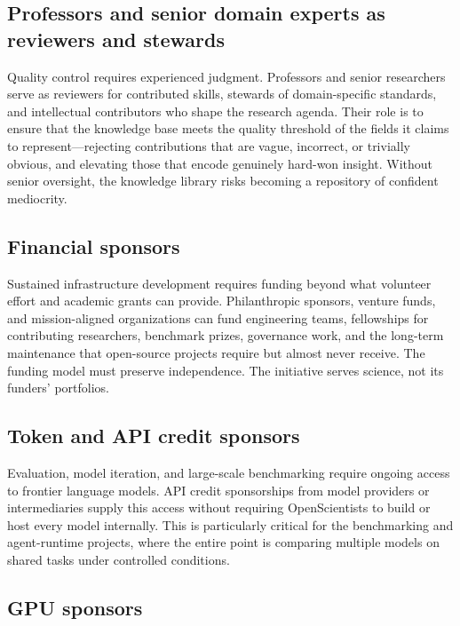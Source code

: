 \documentclass[11pt]{article}
\begin{document}
\subsection{Professors and senior domain experts as reviewers and stewards}

Quality control requires experienced judgment. Professors and senior researchers serve as reviewers for contributed skills, stewards of domain-specific standards, and intellectual contributors who shape the research agenda. Their role is to ensure that the knowledge base meets the quality threshold of the fields it claims to represent---rejecting contributions that are vague, incorrect, or trivially obvious, and elevating those that encode genuinely hard-won insight. Without senior oversight, the knowledge library risks becoming a repository of confident mediocrity.

\subsection{Financial sponsors}

Sustained infrastructure development requires funding beyond what volunteer effort and academic grants can provide. Philanthropic sponsors, venture funds, and mission-aligned organizations can fund engineering teams, fellowships for contributing researchers, benchmark prizes, governance work, and the long-term maintenance that open-source projects require but almost never receive. The funding model must preserve independence. The initiative serves science, not its funders' portfolios.

\subsection{Token and API credit sponsors}

Evaluation, model iteration, and large-scale benchmarking require ongoing access to frontier language models. API credit sponsorships from model providers or intermediaries supply this access without requiring OpenScientists to build or host every model internally. This is particularly critical for the benchmarking and agent-runtime projects, where the entire point is comparing multiple models on shared tasks under controlled conditions.

\subsection{GPU sponsors}
\end{document}
